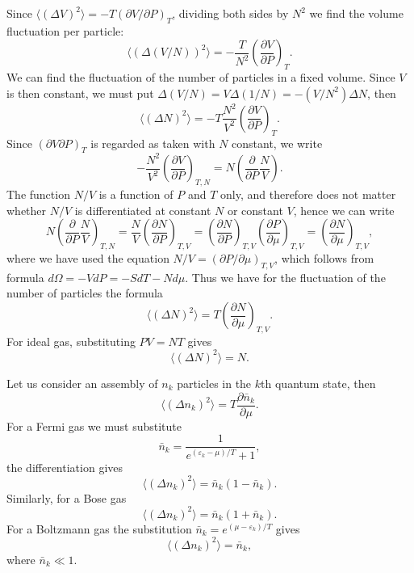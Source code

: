 \documentclass{book}
\newcommand{\average}[1]{\langle#1\rangle}
\numberwithin{equation}{section}
\begin{document}
Since $\average{(\Delta V)^2}=-T(\partial V/\partial P)_T$, dividing
both sides by $N^2$ we find the volume fluctuation per particle:
\begin{equation}
  \average{(\Delta (V/N))^2}=-\frac{T}{N^2}\left(\frac{\partial
    V}{\partial P}\right)_T.
\end{equation}
We can find the fluctuation of the number of particles in a fixed
volume. Since $V$ is then constant, we must put
$\Delta(V/N)=V\Delta(1/N)=-(V/N^2)\Delta N$, then
\begin{equation}
  \average{(\Delta N)^2}=-T\frac{N^2}{V^2}\left(\frac{\partial V}{\partial P}
  \right)_T.
\end{equation}
Since $(\partial V\partial P)_T$ is regarded as taken with $N$ constant, we
write
\begin{equation}
  -\frac{N^2}{V^2}\left(\frac{\partial V}{\partial P}\right)_{T,N}=
  N\left(\frac{\partial}{\partial P}\frac{N}{V}\right).
\end{equation}
The function $N/V$ is a function of $P$ and $T$ only, and therefore does not
matter whether $N/V$ is differentiated at constant $N$ or constant $V$, hence
we can write
\begin{equation}
  N\left(\frac{\partial}{\partial P}\frac{N}{V}\right)_{T,N}=
  \frac{N}{V}\left(\frac{\partial N}{\partial P}\right)_{T,V}=
  \left(\frac{\partial N}{\partial P}\right)_{T,V}
  \left(\frac{\partial P}{\partial\mu}\right)_{T,V}=
  \left(\frac{\partial N}{\partial\mu}\right)_{T,V},
\end{equation}
where we have used the equation $N/V=(\partial P/\partial\mu)_{T,V}$,
which follows from formula $d\Omega=-VdP=-SdT-Nd\mu$. Thus we have for
the fluctuation of the number of particles the formula
\begin{equation}
  \average{(\Delta N)^2}=T\left(\frac{\partial N}{\partial \mu}\right)_{T,V}.
\end{equation}
For ideal gas, substituting $PV=NT$ gives
\begin{equation}
  \average{(\Delta N)^2}=N.
\end{equation}

Let us consider an assembly of $n_k$ particles in the $k$th quantum state, 
then
\begin{equation}
  \average{(\Delta n_k)^2}=T\frac{\partial\bar{n}_k}{\partial\mu}.
\end{equation}
For a Fermi gas we must substitute
\begin{equation}
  \bar{n}_k=\frac{1}{e^{(\varepsilon_k-\mu)/T}+1},
\end{equation}
the differentiation gives
\begin{equation}
  \average{(\Delta n_k)^2}=\bar{n}_k(1-\bar{n}_k).
\end{equation}
Similarly, for a Bose gas
\begin{equation}
  \average{(\Delta n_k)^2}=\bar{n}_k(1+\bar{n}_k).
\end{equation}
For a Boltzmann gas the substitution $\bar{n}_k=e^{(\mu-\varepsilon_k)/T}$ gives
\begin{equation}
  \average{(\Delta n_k)^2}=\bar{n}_k,
\end{equation}
where $\bar{n}_k\ll1$.
\end{document}
